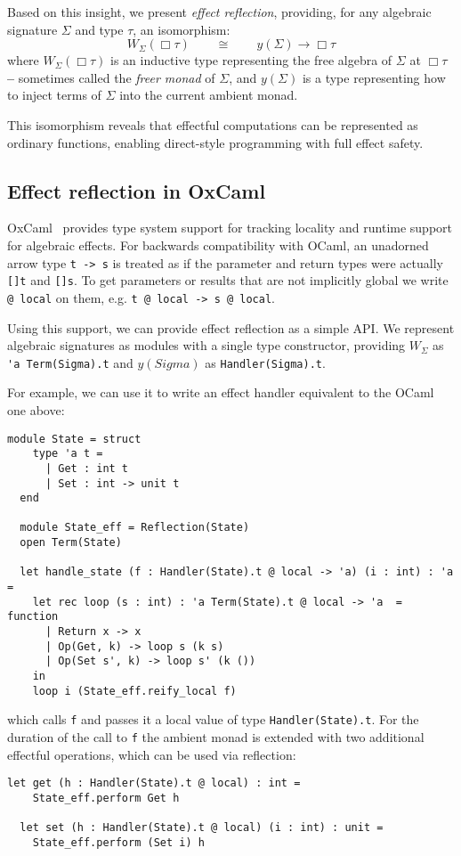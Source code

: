 \documentclass[acmsmall, screen, review, anonymous]{acmart}
\theoremstyle{definition}
\newcommand{\glob}{\mathop{\Box}}
\newcommand{\yoneda}[1]{y(#1)}
\newcommand{\ind}[1]{W_{#1}}
\begin{document}
Based on this insight, we present \emph{effect reflection}, providing,
for any algebraic signature $\Sigma$ and type $\tau$, an isomorphism:
\begin{equation*}
  \ind{\Sigma}(\glob \tau)
  \qquad \cong \qquad
  \yoneda{\Sigma} \rightarrow \glob \tau
\end{equation*}
where $\ind{\Sigma}(\glob \tau)$ is an inductive type representing the
free algebra of $\Sigma$ at $\glob \tau$ \textbf{--} sometimes called
the \emph{freer monad} of $\Sigma$, and $\yoneda{\Sigma}$ is a type
representing how to inject terms of $\Sigma$ into the current ambient
monad.

This isomorphism reveals that effectful computations can be represented
as ordinary functions, enabling direct-style programming with full
effect safety.

\subsection{Effect reflection in OxCaml}
OxCaml~\cite{lorenzen2024oxidizing} provides type system support for
tracking locality and runtime support for algebraic effects. For
backwards compatibility with OCaml, an unadorned arrow type
\lstinline[style=oxcaml]{t -> s} is treated as if the parameter and
return types were actually \lstinline[style=oxcaml]{[]t} and
\lstinline[style=oxcaml]{[]s}. To get parameters or results that are not
implicitly global we write \lstinline[style=oxcaml]{@ local} on them,
e.g. \lstinline[style=oxcaml]{t @ local -> s @ local}.

Using this support, we can provide effect reflection as a simple API.
We represent algebraic signatures as modules with a single type
constructor, providing $\ind{\Sigma}$ as
\lstinline[style=oxcaml]{'a Term(Sigma).t} and $\yoneda{Sigma}$ as
\lstinline[style=oxcaml]{Handler(Sigma).t}.

For example, we can use it to write an effect handler equivalent to the
OCaml one above:
\begin{lstlisting}[style=oxcaml]
  module State = struct
    type 'a t =
      | Get : int t
      | Set : int -> unit t
  end

  module State_eff = Reflection(State)
  open Term(State)

  let handle_state (f : Handler(State).t @ local -> 'a) (i : int) : 'a =
    let rec loop (s : int) : 'a Term(State).t @ local -> 'a  = function
      | Return x -> x
      | Op(Get, k) -> loop s (k s)
      | Op(Set s', k) -> loop s' (k ())
    in
    loop i (State_eff.reify_local f)
\end{lstlisting}
which calls \lstinline[style=oxcaml]{f} and passes it a local value of
type \lstinline[style=oxcaml]{Handler(State).t}. For the duration of the
call to \lstinline[style=oxcaml]{f} the ambient monad is extended with
two additional effectful operations, which can be used via reflection:
\begin{lstlisting}[style=oxcaml]
  let get (h : Handler(State).t @ local) : int =
    State_eff.perform Get h

  let set (h : Handler(State).t @ local) (i : int) : unit =
    State_eff.perform (Set i) h
\end{lstlisting}
\end{document}
